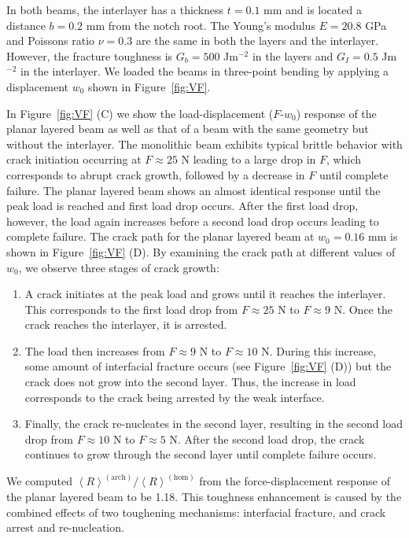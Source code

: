 \documentclass[12pt,onecolumn]{article}
\begin{document}
\begin{bibunit}
In both beams, the interlayer has a thickness $t = 0.1$ mm and is located a distance $b = 0.2$ mm from the notch root.  The Young's modulus $E = 20.8$ GPa and Poissons ratio $\nu = 0.3$ are the same in both the layers and the interlayer. However, the fracture toughness is $G_b = 500$ Jm$^{-2}$ in the layers and $G_I = 0.5$ Jm$^{-2}$ in the interlayer. We loaded the beams in three-point bending by applying a displacement $w_0$ shown in Figure~\ref{fig:VF}. 

In Figure~\ref{fig:VF} (C) we show the load-displacement ($F$-$w_0$) response of the planar layered beam as well as that of a beam with the same geometry but without the interlayer. The monolithic beam exhibits typical brittle behavior with crack initiation occurring at $F\approx25$ N leading to a large drop in $F$, which corresponds to abrupt crack growth, followed by a decrease in $F$ until complete failure. The planar layered beam shows an almost identical response until the peak load is reached and first load drop occurs. After the first load drop, however, the load again increases before a second load drop occurs leading to complete failure. The crack path for the planar layered beam at $w_0 = 0.16$ mm is shown in Figure~\ref{fig:VF} (D). By examining the crack path at different values of $w_0$, we observe three stages of crack growth:
%
\begin{enumerate}
    \item A crack initiates at the peak load and grows until it reaches the interlayer. This corresponds to the first load drop from $F \approx 25$ N to $F \approx 9$ N. Once the crack reaches the interlayer, it is arrested.
    \item The load then increases from $F \approx 9$ N to $F \approx 10$ N. During this increase, some amount of interfacial fracture occurs (see Figure~\ref{fig:VF} (D)) but the crack does not grow into the second layer. Thus, the increase in load corresponds to the crack being arrested by the weak interface.
    \item Finally, the crack re-nucleates in the second layer, resulting in the second load drop from $F \approx 10$ N to $F \approx 5$ N. After the second load drop, the crack continues to grow through the second layer until complete failure occurs.
\end{enumerate}
%
We computed $\left< R\right>^{(\mathrm{arch})}/\left< R\right>^{(\mathrm{hom})}$ from the force-displacement response of the planar layered beam to be 1.18. This toughness enhancement is caused by the combined effects of two toughening mechanisms: interfacial fracture, and crack arrest and re-nucleation.


\end{bibunit}
\end{document}
